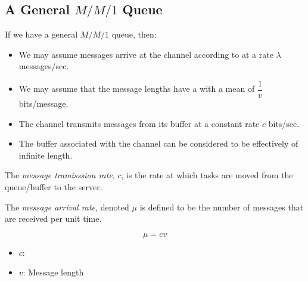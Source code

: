 \subsection{\texorpdfstring{A General $M/M/1$ Queue}{A General Queue}}\label{subsec:General_MM1_Queue}
If we have a general $M/M/1$ queue, then:
\begin{itemize}[noitemsep]
\item We may assume messages arrive at the channel according to  at a rate $\lambda$ messages/sec.
\item We may assume that the message lengths have a  with a mean of $\dfrac{1}{v}$ bits/message.
\item The channel transmits messages from its buffer at a constant rate $c$ bits/sec.
\item The buffer associated with the channel can be considered to be effectively of infinite length.
\end{itemize}

\begin{definition}\label{def:Message_Transmission_Rate}
  The \emph{message tramisssion rate}, $c$, is the rate at which tasks are moved from the queue/buffer to the server.
\end{definition}

\begin{definition}\label{def:Message_Arrival_Rate}
  The \emph{message arrival rate}, denoted $\mu$ is defined to be the number of messages that are received per unit time.

  \begin{equation}\label{eq:Message_Arrival_Rate}
    \mu = c v
  \end{equation}
  \begin{itemize}[noitemsep]
  \item $c$: 
  \item $v$: Message length
  \end{itemize}
\end{definition}

